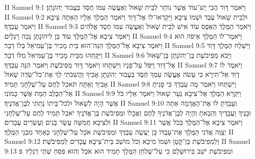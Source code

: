 II Samuel 9:1	וַיֹּאמֶר דָּוִד הֲכִי יֶשׁ־עוֹד אֲשֶׁר נוֹתַר לְבֵית שָׁאוּל וְאֶעֱשֶׂה עִמּוֹ חֶסֶד בַּעֲבוּר יְהוֹנָתָן׃
II Samuel 9:2	וּלְבֵית שָׁאוּל עֶבֶד וּשְׁמוֹ צִיבָא וַיִּקְרְאוּ־לוֹ אֶל־דָּוִד וַיֹּאמֶר הַמֶּלֶךְ אֵלָיו הַאַתָּה צִיבָא וַיֹּאמֶר עַבְדֶּךָ׃
II Samuel 9:3	וַיֹּאמֶר הַמֶּלֶךְ הַאֶפֶס עוֹד אִישׁ לְבֵית שָׁאוּל וְאֶעֱשֶׂה עִמּוֹ חֶסֶד אֱלֹהִים וַיֹּאמֶר צִיבָא אֶל־הַמֶּלֶךְ עוֹד בֵּן לִיהוֹנָתָן נְכֵה רַגְלָיִם׃
II Samuel 9:4	וַיֹּאמֶר־לוֹ הַמֶּלֶךְ אֵיפֹה הוּא וַיֹּאמֶר צִיבָא אֶל־הַמֶּלֶךְ הִנֵּה־הוּא בֵּית מָכִיר בֶּן־עַמִּיאֵל בְּלוֹ דְבָר׃
II Samuel 9:5	וַיִּשְׁלַח הַמֶּלֶךְ דָּוִד וַיִּקָּחֵהוּ מִבֵּית מָכִיר בֶּן־עַמִּיאֵל מִלּוֹ דְבָר׃
II Samuel 9:6	וַיָּבֹא מְפִיבֹשֶׁת בֶּן־יְהוֹנָתָן בֶּן־שָׁאוּל אֶל־דָּוִד וַיִּפֹּל עַל־פָּנָיו וַיִּשְׁתָּחוּ וַיֹּאמֶר דָּוִד מְפִיבֹשֶׁת וַיֹּאמֶר הִנֵּה עַבְדֶּךָ׃
II Samuel 9:7	וַיֹּאמֶר לוֹ דָוִד אַל־תִּירָא כִּי עָשֹׂה אֶעֱשֶׂה עִמְּךָ חֶסֶד בַּעֲבוּר יְהוֹנָתָן אָבִיךָ וַהֲשִׁבֹתִי לְךָ אֶת־כּל־שְׂדֵה שָׁאוּל אָבִיךָ וְאַתָּה תֹּאכַל לֶחֶם עַל־שֻׁלְחָנִי תָּמִיד׃
II Samuel 9:8	וַיִּשְׁתַּחוּ וַיֹּאמֶר מֶה עַבְדֶּךָ כִּי פָנִיתָ אֶל־הַכֶּלֶב הַמֵּת אֲשֶׁר כָּמוֹנִי׃
II Samuel 9:9	וַיִּקְרָא הַמֶּלֶךְ אֶל־צִיבָא נַעַר שָׁאוּל וַיֹּאמֶר אֵלָיו כֹּל אֲשֶׁר הָיָה לְשָׁאוּל וּלְכל־בֵּיתוֹ נָתַתִּי לְבֶן־אֲדֹנֶיךָ׃
II Samuel 9:10	וְעָבַדְתָּ לּוֹ אֶת־הָאֲדָמָה אַתָּה וּבָנֶיךָ וַעֲבָדֶיךָ וְהֵבֵאתָ וְהָיָה לְבֶן־אֲדֹנֶיךָ לֶּחֶם וַאֲכָלוֹ וּמְפִיבֹשֶׁת בֶּן־אֲדֹנֶיךָ יֹאכַל תָּמִיד לֶחֶם עַל־שֻׁלְחָנִי וּלְצִיבָא חֲמִשָּׁה עָשָׂר בָּנִים וְעֶשְׂרִים עֲבָדִים׃
II Samuel 9:11	וַיֹּאמֶר צִיבָא אֶל־הַמֶּלֶךְ כְּכֹל אֲשֶׁר יְצַוֶּה אֲדֹנִי הַמֶּלֶךְ אֶת־עַבְדּוֹ כֵּן יַעֲשֶׂה עַבְדֶּךָ וּמְפִיבֹשֶׁת אֹכֵל עַל־שֻׁלְחָנִי כְּאַחַד מִבְּנֵי הַמֶּלֶךְ׃
II Samuel 9:12	וְלִמְפִיבֹשֶׁת בֵּן־קָטָן וּשְׁמוֹ מִיכָא וְכֹל מוֹשַׁב בֵּית־צִיבָא עֲבָדִים לִמְפִיבֹשֶׁת׃
II Samuel 9:13	וּמְפִיבֹשֶׁת יֹשֵׁב בִּירוּשָׁלַ͏ִם כִּי עַל־שֻׁלְחַן הַמֶּלֶךְ תָּמִיד הוּא אֹכֵל וְהוּא פִסֵּחַ שְׁתֵּי רַגְלָיו׃ {פ}
